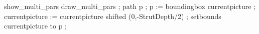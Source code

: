 
  \iftracepositions show_multi_pars \else draw_multi_pars \fi ;
  path p ; p := boundingbox currentpicture ;
  currentpicture := currentpicture shifted (0,-StrutDepth/2) ;
  setbounds currentpicture to p ;
\stopuseMPgraphic

\setupcolors[state=start]


